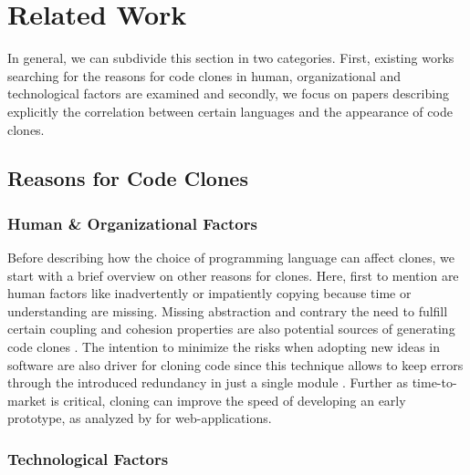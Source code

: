 
\section{Related Work}
\label{sec:related_work}

In general, we can subdivide this section in two categories. First, existing works searching for the reasons for code clones in human, organizational and technological factors are examined and secondly, we focus on papers describing explicitly the correlation between certain languages and the appearance of code clones.

\subsection{Reasons for Code Clones}
\label{sec:reasons_for_code_clones}

\subsubsection{Human \& Organizational Factors}

Before describing how the choice of programming language can affect clones, we start with a brief overview on other reasons for clones. Here, first to mention are human factors like inadvertently or impatiently copying because time or understanding are missing. Missing abstraction and contrary the need to fulfill certain coupling and cohesion properties are also potential sources of generating code clones \cite{kasper2006cloning}.
The intention to minimize the risks when adopting new ideas in software are also driver for cloning code since this technique allows to keep errors through the introduced redundancy in just a single module \cite{cordy2003comprehending}. Further as time-to-market is critical, cloning can improve the speed of developing an early prototype, as analyzed by \cite{rajapakse2007using} for web-applications.

\subsubsection{Technological Factors}

